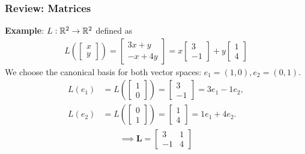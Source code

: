 \documentclass{beamer}
\begin{document}
\begin{frame}[t]
	\frametitle{Review: Matrices}
	\textbf{Example}: $L : \mathbb{R}^2 \to \mathbb{R}^2$ defined as 
	\begin{align*}	
	L\left( \begin{bmatrix} x \\ y \end{bmatrix} \right) = \begin{bmatrix} 3x+y \\ -x+4y \end{bmatrix} = x \begin{bmatrix} 3 \\ -1 \end{bmatrix} + y \begin{bmatrix} 1 \\ 4 \end{bmatrix}
	\end{align*}
	We choose the canonical basis for both vector spaces: $e_1 = (1,0), e_2 = (0,1)$.
	\begin{align*}
	L(e_1) &= L\left( \begin{bmatrix} 1 \\ 0 \end{bmatrix} \right) = \begin{bmatrix} 3 \\ -1 \end{bmatrix} = 3 e_1 -1 e_2, \\  
	L(e_2) &= L\left( \begin{bmatrix} 0 \\ 1 \end{bmatrix} \right) = \begin{bmatrix} 1 \\ 4 \end{bmatrix} = 1 e_1 + 4 e_2.
	\end{align*}
	\begin{align*}
	\implies \mathbf{L} = \begin{bmatrix} 3 & 1 \\ -1 & 4 \end{bmatrix}
	\end{align*}
\end{frame}
\end{document}
